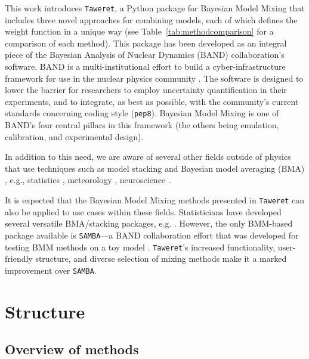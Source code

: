 \documentclass[10pt, preprint,aps,prc,floatfix,
tightenlines,
nofootinbib,superscriptaddress]{revtex4-2}
\begin{document}
This work introduces \texttt{Taweret}, a Python package for Bayesian Model Mixing that includes three novel approaches for combining models, each of which defines the weight function in a unique way (see Table~\ref{tab:methodcomparison} for a comparison of each method). This package has been developed as an integral piece of the Bayesian Analysis of Nuclear Dynamics (BAND) collaboration's software. BAND is a multi-institutional effort to build a cyber-infrastructure framework for use in the nuclear physics community \cite{Phillips:2020dmw, bandframework}. The software is designed to lower the barrier for researchers to employ uncertainty quantification in their experiments, and to integrate, as best as possible, with the community's current standards concerning coding style (\texttt{pep8}). Bayesian Model Mixing is one of BAND's four central pillars in this framework (the others being emulation, calibration, and experimental design).

In addition to this need, we are aware of several other fields outside of physics that use techniques such as model stacking and Bayesian model averaging (BMA) \cite{Fragoso2018}, e.g., statistics \cite{Yao2018, Yao2022}, meteorology \cite{Sloughter2007}, neuroscience \cite{FitzGerald2014}.

It is expected that the Bayesian Model Mixing methods presented in \texttt{Taweret} can also be applied to use cases within these fields. 
Statisticians have developed several versatile BMA/stacking packages, e.g. \cite{loo, BMA_R}. However, the only BMM-based package available is \texttt{SAMBA}---a BAND collaboration effort that was developed for testing BMM methods on a toy model \cite{Semposki:2022gcp}. \texttt{Taweret}'s increased functionality, user-friendly structure, and diverse selection of mixing methods make it a marked improvement over \texttt{SAMBA}. 

\section{Structure}

\subsection{Overview of methods}
\end{document}
